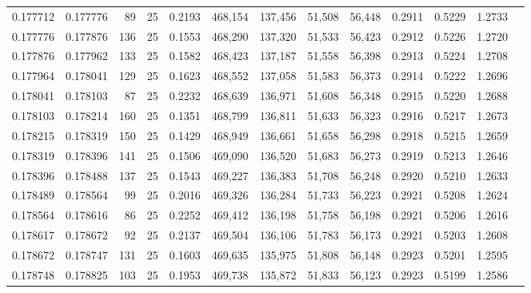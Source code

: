 \begin{tabular}{rrrrrrrrrrrrr}
0.177712 & 0.177776 &    89 &  25 &                                     0.2193 & 468,154 & 137,456 &  51,508 &  56,448 & 0.2911 & 0.5229 & 1.2733 \\
0.177776 & 0.177876 &   136 &  25 &                                     0.1553 & 468,290 & 137,320 &  51,533 &  56,423 & 0.2912 & 0.5226 & 1.2720 \\
0.177876 & 0.177962 &   133 &  25 &                                     0.1582 & 468,423 & 137,187 &  51,558 &  56,398 & 0.2913 & 0.5224 & 1.2708 \\
0.177964 & 0.178041 &   129 &  25 &                                     0.1623 & 468,552 & 137,058 &  51,583 &  56,373 & 0.2914 & 0.5222 & 1.2696 \\
0.178041 & 0.178103 &    87 &  25 &                                     0.2232 & 468,639 & 136,971 &  51,608 &  56,348 & 0.2915 & 0.5220 & 1.2688 \\
0.178103 & 0.178214 &   160 &  25 &                                     0.1351 & 468,799 & 136,811 &  51,633 &  56,323 & 0.2916 & 0.5217 & 1.2673 \\
0.178215 & 0.178319 &   150 &  25 &                                     0.1429 & 468,949 & 136,661 &  51,658 &  56,298 & 0.2918 & 0.5215 & 1.2659 \\
0.178319 & 0.178396 &   141 &  25 &                                     0.1506 & 469,090 & 136,520 &  51,683 &  56,273 & 0.2919 & 0.5213 & 1.2646 \\
0.178396 & 0.178488 &   137 &  25 &                                     0.1543 & 469,227 & 136,383 &  51,708 &  56,248 & 0.2920 & 0.5210 & 1.2633 \\
0.178489 & 0.178564 &    99 &  25 &                                     0.2016 & 469,326 & 136,284 &  51,733 &  56,223 & 0.2921 & 0.5208 & 1.2624 \\
0.178564 & 0.178616 &    86 &  25 &                                     0.2252 & 469,412 & 136,198 &  51,758 &  56,198 & 0.2921 & 0.5206 & 1.2616 \\
0.178617 & 0.178672 &    92 &  25 &                                     0.2137 & 469,504 & 136,106 &  51,783 &  56,173 & 0.2921 & 0.5203 & 1.2608 \\
0.178672 & 0.178747 &   131 &  25 &                                     0.1603 & 469,635 & 135,975 &  51,808 &  56,148 & 0.2923 & 0.5201 & 1.2595 \\
0.178748 & 0.178825 &   103 &  25 &                                     0.1953 & 469,738 & 135,872 &  51,833 &  56,123 & 0.2923 & 0.5199 & 1.2586 \\

\end{tabular}
